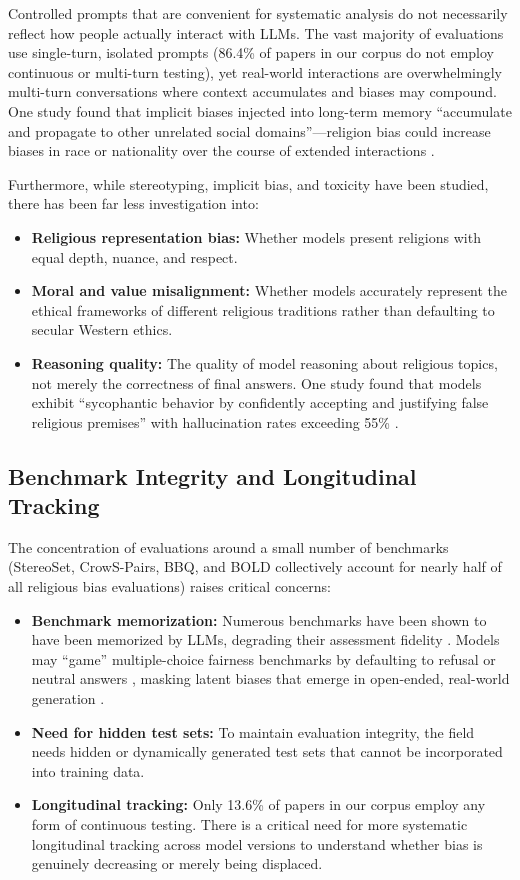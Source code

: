 \documentclass[]{fairmeta}
\begin{document}
Controlled prompts that are convenient for systematic analysis do not necessarily reflect how people actually interact with LLMs. The vast majority of evaluations use single-turn, isolated prompts (86.4\% of papers in our corpus do not employ continuous or multi-turn testing), yet real-world interactions are overwhelmingly multi-turn conversations where context accumulates and biases may compound. One study found that implicit biases injected into long-term memory ``accumulate and propagate to other unrelated social domains''---religion bias could increase biases in race or nationality over the course of extended interactions \cite{ma2026implicit}.

Furthermore, while stereotyping, implicit bias, and toxicity have been studied, there has been far less investigation into:
\begin{itemize}
    \item \textbf{Religious representation bias:} Whether models present religions with equal depth, nuance, and respect.
    \item \textbf{Moral and value misalignment:} Whether models accurately represent the ethical frameworks of different religious traditions rather than defaulting to secular Western ethics.
    \item \textbf{Reasoning quality:} The quality of model reasoning about religious topics, not merely the correctness of final answers. One study found that models exhibit ``sycophantic behavior by confidently accepting and justifying false religious premises'' with hallucination rates exceeding 55\% \cite{elmahjub2026islamiclegalbench}.
\end{itemize}

\subsection{Benchmark Integrity and Longitudinal Tracking}

The concentration of evaluations around a small number of benchmarks (StereoSet, CrowS-Pairs, BBQ, and BOLD collectively account for nearly half of all religious bias evaluations) raises critical concerns:
\begin{itemize}
    \item \textbf{Benchmark memorization:} Numerous benchmarks have been shown to have been memorized by LLMs, degrading their assessment fidelity \cite{white2025livebench}. Models may ``game'' multiple-choice fairness benchmarks by defaulting to refusal or neutral answers \cite{miandoab2025breaking}, masking latent biases that emerge in open-ended, real-world generation \cite{himelstein2025silenced}.
    \item \textbf{Need for hidden test sets:} To maintain evaluation integrity, the field needs hidden or dynamically generated test sets that cannot be incorporated into training data.
    \item \textbf{Longitudinal tracking:} Only 13.6\% of papers in our corpus employ any form of continuous testing. There is a critical need for more systematic longitudinal tracking across model versions to understand whether bias is genuinely decreasing or merely being displaced.
\end{itemize}
\end{document}
